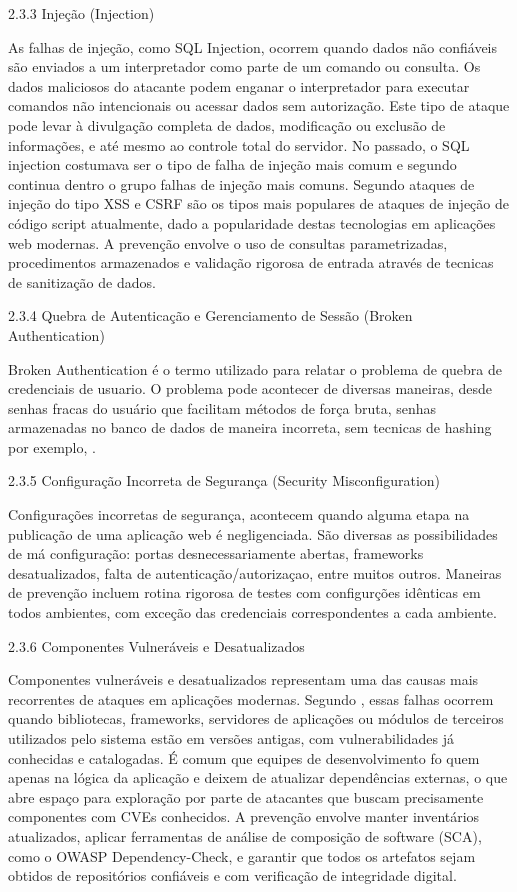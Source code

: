 \documentclass[12pt]{article}
\begin{document}
2.3.3 Injeção (Injection)

As falhas de injeção, como SQL Injection, ocorrem quando dados não confiáveis são enviados a um interpretador como parte de um comando ou consulta. Os dados maliciosos do 
atacante podem enganar o interpretador para executar comandos não intencionais ou acessar dados sem autorização. Este tipo de ataque pode levar à divulgação completa de 
dados, modificação ou exclusão de informações, e até mesmo ao controle total do servidor. No passado, o SQL injection costumava ser o tipo de falha de injeção mais comum 
e segundo\cite{owasp10} continua dentro o grupo falhas de injeção mais comuns. Segundo \textcite{souza2021} ataques de injeção do tipo XSS e CSRF são os tipos mais populares
 de ataques de injeção de
código script atualmente, dado a popularidade destas tecnologias em aplicações web modernas. A prevenção envolve o uso de consultas parametrizadas, procedimentos armazenados 
e validação rigorosa de entrada através de tecnicas de sanitização de dados.

2.3.4 Quebra de Autenticação e Gerenciamento de Sessão (Broken Authentication)

Broken Authentication  é o termo utilizado para relatar o problema de quebra de credenciais de usuario. O problema pode acontecer de diversas maneiras, desde senhas fracas 
do usuário que facilitam métodos de força bruta, senhas armazenadas no banco de dados de maneira incorreta, sem tecnicas de hashing por exemplo, \cite{Matthew2020}.

2.3.5 Configuração Incorreta de Segurança (Security Misconfiguration)

Configurações incorretas de segurança, acontecem quando alguma etapa na publicação de uma aplicação web é negligenciada. São diversas as possibilidades de má configuração: 
portas desnecessariamente abertas, frameworks desatualizados, falta de autenticação/autorizaçao, entre muitos outros.  Maneiras de prevenção incluem rotina rigorosa de testes
 com configurções idênticas em todos ambientes, com exceção das credenciais correspondentes a cada ambiente.


2.3.6 Componentes Vulneráveis e Desatualizados

Componentes vulneráveis e desatualizados representam uma das causas mais recorrentes de ataques em aplicações modernas. Segundo \textcite{owasp10}, essas falhas ocorrem quando
 bibliotecas, frameworks, servidores de aplicações ou módulos de terceiros utilizados pelo sistema estão em versões antigas, com vulnerabilidades já conhecidas e catalogadas.
  É comum que equipes de desenvolvimento fo quem apenas na lógica da aplicação e deixem de atualizar dependências externas, o que abre espaço para exploração por parte de atacantes
   que buscam precisamente componentes com CVEs conhecidos. A prevenção envolve manter inventários atualizados, aplicar ferramentas de análise de composição de software (SCA),
    como o OWASP Dependency-Check, e garantir que todos os artefatos sejam obtidos de repositórios confiáveis e com verificação de integridade digital.
\end{document}

